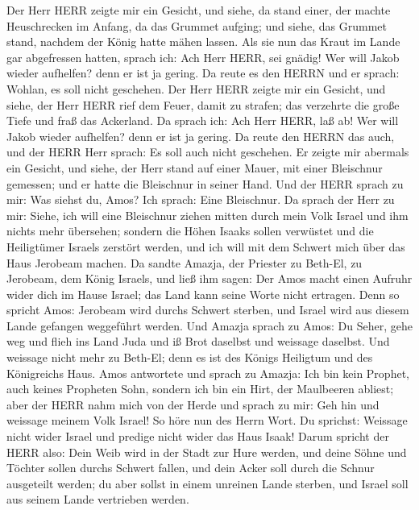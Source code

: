  Der Herr HERR zeigte mir ein Gesicht, und siehe, da stand
einer, der machte Heuschrecken im Anfang, da das Grummet aufging; und
siehe, das Grummet stand, nachdem der König hatte mähen lassen.
 Als sie nun das Kraut im Lande gar abgefressen hatten,
sprach ich: Ach Herr HERR, sei gnädig! Wer will Jakob wieder aufhelfen?
denn er ist ja gering.  Da reute es den HERRN und er sprach:
Wohlan, es soll nicht geschehen.  Der Herr HERR zeigte mir
ein Gesicht, und siehe, der Herr HERR rief dem Feuer, damit zu strafen;
das verzehrte die große Tiefe und fraß das Ackerland.  Da
sprach ich: Ach Herr HERR, laß ab! Wer will Jakob wieder aufhelfen? denn
er ist ja gering.  Da reute den HERRN das auch, und der HERR
Herr sprach: Es soll auch nicht geschehen.  Er zeigte mir
abermals ein Gesicht, und siehe, der Herr stand auf einer Mauer, mit
einer Bleischnur gemessen; und er hatte die Bleischnur in seiner Hand.
 Und der HERR sprach zu mir: Was siehst du, Amos? Ich
sprach: Eine Bleischnur. Da sprach der Herr zu mir: Siehe, ich will eine
Bleischnur ziehen mitten durch mein Volk Israel und ihm nichts mehr
übersehen;  sondern die Höhen Isaaks sollen verwüstet und
die Heiligtümer Israels zerstört werden, und ich will mit dem Schwert
mich über das Haus Jerobeam machen.  Da sandte Amazja, der
Priester zu Beth-El, zu Jerobeam, dem König Israels, und ließ ihm sagen:
Der Amos macht einen Aufruhr wider dich im Hause Israel; das Land kann
seine Worte nicht ertragen.  Denn so spricht Amos: Jerobeam
wird durchs Schwert sterben, und Israel wird aus diesem Lande gefangen
weggeführt werden.  Und Amazja sprach zu Amos: Du Seher,
gehe weg und flieh ins Land Juda und iß Brot daselbst und weissage
daselbst.  Und weissage nicht mehr zu Beth-El; denn es ist
des Königs Heiligtum und des Königreichs Haus.  Amos
antwortete und sprach zu Amazja: Ich bin kein Prophet, auch keines
Propheten Sohn, sondern ich bin ein Hirt, der Maulbeeren abliest;
 aber der HERR nahm mich von der Herde und sprach zu mir:
Geh hin und weissage meinem Volk Israel!  So höre nun des
Herrn Wort. Du sprichst: Weissage nicht wider Israel und predige nicht
wider das Haus Isaak!  Darum spricht der HERR also: Dein
Weib wird in der Stadt zur Hure werden, und deine Söhne und Töchter
sollen durchs Schwert fallen, und dein Acker soll durch die Schnur
ausgeteilt werden; du aber sollst in einem unreinen Lande sterben, und
Israel soll aus seinem Lande vertrieben werden.

